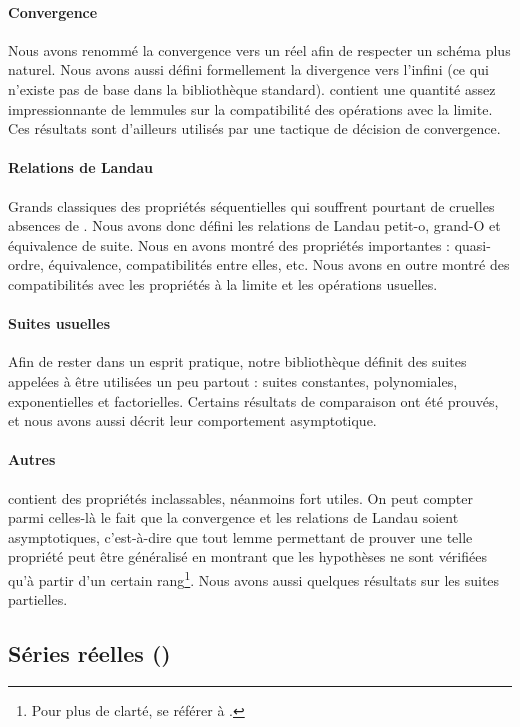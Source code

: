 \paragraph{Convergence} Nous avons renommé la convergence vers un réel afin de respecter un schéma plus naturel. Nous avons aussi défini formellement la divergence vers l'infini (ce qui n'existe pas de base dans la bibliothèque standard).  contient une quantité assez impressionnante de lemmules sur la compatibilité des opérations avec la limite. Ces résultats sont d'ailleurs utilisés par une tactique de décision de convergence.

\paragraph{Relations de Landau} Grands classiques des propriétés séquentielles qui souffrent pourtant de cruelles absences de . Nous avons donc défini les relations de Landau petit-o, grand-O et équivalence de suite. Nous en avons montré des propriétés importantes : quasi-ordre, équivalence, compatibilités entre elles, etc. Nous avons en outre montré des compatibilités avec les propriétés à la limite et les opérations usuelles.

\paragraph{Suites usuelles} Afin de rester dans un esprit pratique, notre bibliothèque définit des suites appelées à être utilisées un peu partout : suites constantes, polynomiales, exponentielles et factorielles. Certains résultats de comparaison ont été prouvés, et nous avons aussi décrit leur comportement asymptotique.

\paragraph{Autres}  contient des propriétés inclassables, néanmoins fort utiles. On peut compter parmi celles-là le fait que la convergence et les relations de Landau soient asymptotiques, c'est-à-dire que tout lemme permettant de prouver une telle propriété peut être généralisé en montrant que les hypothèses ne sont vérifiées qu'à partir d'un certain rang\footnote{Pour plus de clarté, se référer à .}. Nous avons aussi quelques résultats sur les suites partielles.

\subsection{Séries réelles ()}


